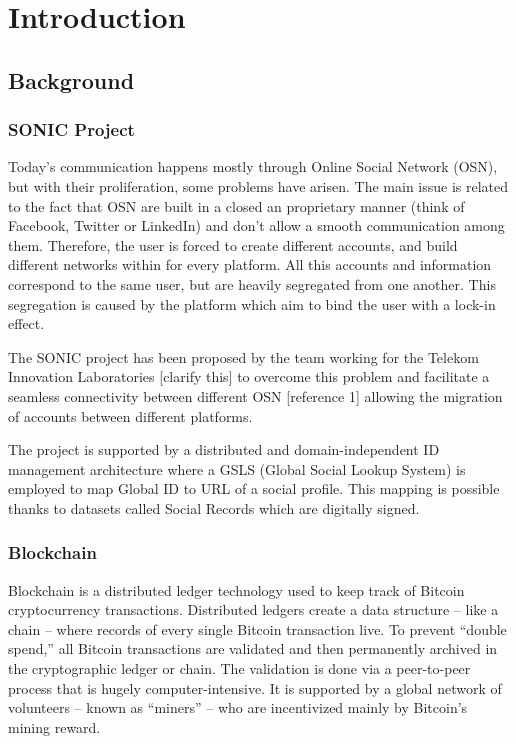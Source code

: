 \chapter{Introduction}
\label{introduction}

\section{Background}
\subsection{SONIC Project}
Today’s communication happens mostly through Online Social Network (OSN), but with their proliferation, some problems have arisen. The main issue is related to the fact that OSN are built in a closed an proprietary manner (think of Facebook, Twitter or LinkedIn) and don’t allow a smooth  communication among them. Therefore, the user is forced to create different accounts, and build different networks within for every platform. All this accounts and information correspond to the same user, but are heavily segregated from one another. This segregation is caused by the platform which aim to bind the user with a lock-in effect. 

The SONIC project has been proposed by the team working for the Telekom Innovation Laboratories [clarify this] to overcome this problem and facilitate a seamless connectivity between different OSN [reference 1] allowing the migration of accounts between different platforms. 

The project is supported by a distributed and domain-independent ID management architecture where a GSLS (Global Social Lookup System) is employed to map Global ID to URL of a social profile. This mapping is possible thanks to datasets called Social Records which are digitally signed. 

\subsection{Blockchain}
Blockchain is a distributed ledger technology used to keep track of Bitcoin cryptocurrency transactions. Distributed ledgers create a data structure – like a chain – where records of every single Bitcoin transaction live. To prevent “double spend,” all Bitcoin transactions are validated and then permanently archived in the cryptographic ledger or chain. The validation is done via a peer-to-peer process that is hugely computer-intensive. It is supported by a global network of volunteers – known as “miners” – who are incentivized mainly by Bitcoin’s mining reward.

